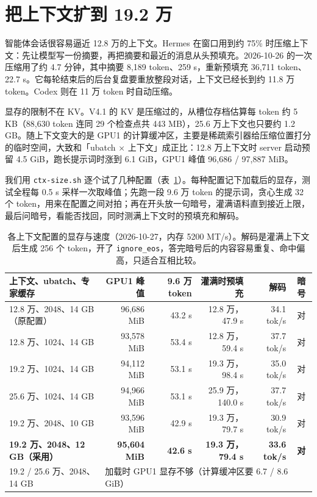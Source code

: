 \documentclass[11pt,a4paper]{article}
\newcommand{\code}[1]{\texttt{#1}}
\newcommand{\tps}{tok/s}
\begin{document}
\section{把上下文扩到 19.2 万}
\label{sec:ctx}

智能体会话很容易逼近 12.8 万的上下文。Hermes 在窗口用到约 75\% 时压缩上下文：先让模型写一份摘要，再把摘要和最近的消息从头预填充。2026-10-26 的一次压缩用了约 4.7 分钟，其中摘要 8,189 token、259 s，重新预填充 36,711 token、22.7 s。它每轮结束后的后台复盘要重放整段对话，上下文已经长到约 11.8 万 token。Codex 则在 11 万 token 时自动压缩。

显存的限制不在 KV。V4.1 的 KV 是压缩过的，从槽位存档估算每 token 约 5 KB（88,630 token 连同 29 个检查点共 443 MB），25.6 万上下文也只要约 1.2 GB。随上下文变大的是 GPU1 的计算缓冲区，主要是稀疏索引器给压缩位置打分的临时空间，大致和「ubatch × 上下文」成正比：12.8 万上下文时 server 启动预留 4.5 GiB，跑长提示词时涨到 6.1 GiB，GPU1 峰值 96,686 / 97,887 MiB。

我们用 \code{ctx-size.sh} 逐个试了几种配置（表~\ref{tab:ctx}）。每种配置记下加载后的显存，测试全程每 0.5 s 采样一次取峰值；先跑一段 9.6 万 token 的提示词，贪心生成 32 个 token，用来在配置之间对拍；再在开头放一句暗号，灌满语料直到接近上限，最后问暗号，看能否找回，同时测满上下文时的预填充和解码。

\begin{table}[h]
  \centering
  \small
  \caption{各上下文配置的显存与速度（2026-10-27，内存 5200 MT/s）。解码是灌满上下文后生成 256 个 token，开了 \code{ignore\_eos}，答完暗号后的内容容易重复、命中偏高，只适合互相比较。}
  \label{tab:ctx}
  \begin{tabular}{@{}l r r r r c@{}}
    \toprule
    上下文、ubatch、专家缓存 & GPU1 峰值 & 9.6 万 token & 灌满时预填充 & 解码 & 暗号 \\
    \midrule
    12.8 万、2048、14 GB（原配置） & 96,686 MiB & 43.2 s & 12.8 万，47.9 s & 34.1 \tps{} & 对 \\
    12.8 万、1024、14 GB & 93,578 MiB & 53.4 s & 12.8 万，59.4 s & 37.7 \tps{} & 对 \\
    19.2 万、1024、14 GB & 94,112 MiB & 53.1 s & 19.3 万，98.4 s & 35.0 \tps{} & 对 \\
    25.6 万、1024、14 GB & 94,966 MiB & 53.1 s & 25.9 万，140.0 s & 37.7 \tps{} & 对 \\
    19.2 万、2048、10 GB & 93,596 MiB & 42.9 s & 19.3 万，79.7 s & 30.9 \tps{} & 对 \\
    \textbf{19.2 万、2048、12 GB（采用）} & \textbf{95,604 MiB} & \textbf{42.6 s} & \textbf{19.3 万，79.4 s} & \textbf{33.6 \tps{}} & \textbf{对} \\
    19.2 / 25.6 万、2048、14 GB & \multicolumn{5}{l}{加载时 GPU1 显存不够（计算缓冲区要 6.7 / 8.6 GiB）} \\
    \bottomrule
  \end{tabular}
\end{table}
\end{document}
